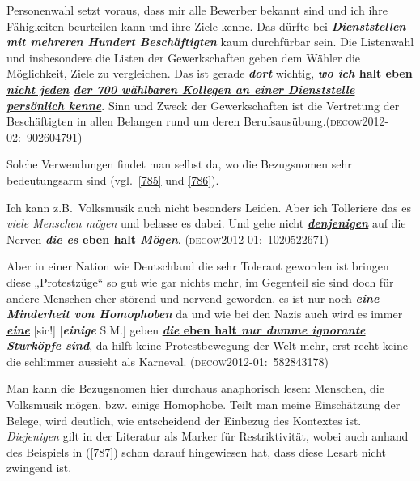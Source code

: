 \begin{exe}
	\ex\label{784} 

	Personenwahl setzt voraus, dass mir alle Bewerber bekannt sind und ich ihre Fähigkeiten beurteilen kann und ihre Ziele 			kenne. Das dürfte bei \textbf{\textit{Dienststellen mit mehreren Hundert Beschäftigten}} kaum durchfürbar sein. Die Listenwahl und insbesondere die Listen der Gewerk\-schaften geben dem Wähler die Möglichkeit, Ziele zu vergleichen. Das ist gerade \ul{\textit{\textbf{dort}}} wichtig, \textbf{\ul{\textit{wo ich} halt eben \textit{nicht jeden}} \ul{\textit{der 700 wählbaren Kollegen an einer Dienststelle persönlich kenne}}}. Sinn und Zweck der Gewerkschaften ist die Vertretung der Beschäftigten in allen 			Belangen rund um deren Berufsausübung.\hfill\hbox{\scshape(decow2012-02: 902604791)}
\end{exe}
Solche Verwendungen findet man selbst da, wo die Bezugsnomen sehr bedeutungsarm sind (vgl.\ \ref{785} und \ref{786}).

\begin{exe}
	\ex\label{785} 

	Ich kann z.B.\ Volksmusik auch nicht besonders Leiden. Aber ich Tolleriere das es \textit{viele Menschen mögen} und belasse es dabei. Und gehe nicht \ul{\textit{\textbf{denjenigen}}} auf die Nerven \ul{\textbf{\textit{die es} eben halt \textit{Mögen}}}.
	\newline\hbox{}\hfill\hbox{\scshape(decow2012-01: 1020522671)}
\end{exe}

\begin{exe}
	\ex\label{786} 

	Aber in einer Nation wie Deutschland die sehr Tolerant geworden ist bringen diese „Protestzüge“ so gut wie gar 		nichts mehr, im Gegenteil sie sind doch für andere Menschen eher störend und nervend geworden. es ist nur noch \textbf{\textit{eine Minderheit von Homophoben}} da und wie bei den Nazis auch wird es immer 									\ul{\textit{\textbf{eine}}} [sic!] [\textbf{\textit{einige}} S.M.] geben \ul{\textbf{\textit{die} eben halt \textit{nur dumme ignorante Sturköpfe sind}}}, da hilft keine Protestbewegung der Welt mehr, erst recht keine die 	schlimmer aussieht als Karneval.                                                                                                                                                               
	\newline\hbox{}\hfill\hbox{\scshape(decow2012-01: 582843178)}
\end{exe}\largerpage
Man kann die Bezugsnomen hier durchaus anaphorisch lesen: Menschen, die Volksmusik mögen, bzw. einige Homophobe. Teilt man meine Einschätzung der Belege, wird deutlich, wie entscheidend der Einbezug des Kontextes ist. \textit{Diejenigen} gilt in der Literatur als Marker für Restriktivität, wobei auch \citet[302]{Bluehdorn2007} anhand des Beispiels in (\ref{787}) schon darauf hingewiesen hat, dass diese Lesart nicht zwingend ist.
	
